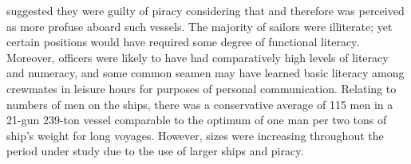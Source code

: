 suggested they were guilty of piracy considering that  and therefore  was perceived as more profuse aboard such vessels. The majority of sailors were illiterate; yet certain positions would have required some degree of functional literacy. Moreover, officers were likely to have had comparatively high levels of literacy and numeracy, and some common seamen may have learned basic literacy among crewmates in leisure hours for purposes of personal communication. Relating to numbers of men on the ships, there was a conservative average of 115 men in a 21-gun 239-ton vessel comparable to the  optimum of one man per two tons of ship’s weight for long voyages. However,  sizes were increasing throughout the period under study due to the use of larger ships and piracy. 

